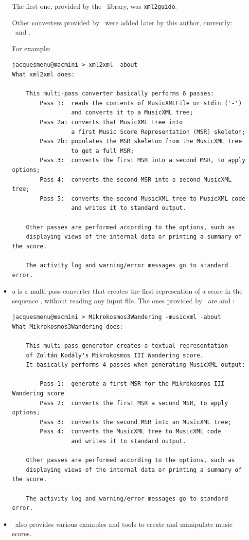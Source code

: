 \begin{itemize}
The first one, provided by the \libmusicxml\ library, was {\tt xml2guido}.

Other converters provided by \mf\ were added later by this author, currently: \xmlToLy\, \xmlToBrl\, \xmlToXml\ and \xmlToGuido.

For example:
\begin{lstlisting}[language=Terminal]
jacquesmenu@macmini > xml2xml -about
What xml2xml does:

    This multi-pass converter basically performs 6 passes:
        Pass 1:  reads the contents of MusicXMLFile or stdin ('-')
                 and converts it to a MusicXML tree;
        Pass 2a: converts that MusicXML tree into
                 a first Music Score Representation (MSR) skeleton;
        Pass 2b: populates the MSR skeleton from the MusicXML tree
                 to get a full MSR;
        Pass 3:  converts the first MSR into a second MSR, to apply options;
        Pass 4:  converts the second MSR into a second MusicXML tree;
        Pass 5:  converts the second MusicXML tree to MusicXML code
                 and writes it to standard output.

    Other passes are performed according to the options, such as
    displaying views of the internal data or printing a summary of the score.

    The activity log and warning/error messages go to standard error.
\end{lstlisting}

\item a  is a multi-pass converter that creates the first represention of a score in the sequence , without reading any input file. The ones provided by \mf\ are  and :
\begin{lstlisting}[language=Terminal]
jacquesmenu@macmini > Mikrokosmos3Wandering -musicxml -about
What Mikrokosmos3Wandering does:

    This multi-pass generator creates a textual representation
    of Zoltán Kodály's Mikrokosmos III Wandering score.
    It basically performs 4 passes when generating MusicXML output:

        Pass 1:  generate a first MSR for the Mikrokosmos III Wandering score
        Pass 2:  converts the first MSR a second MSR, to apply options;
        Pass 3:  converts the second MSR into an MusicXML tree;
        Pass 4:  converts the MusicXML tree to MusicXML code
                 and writes it to standard output.

    Other passes are performed according to the options, such as
    displaying views of the internal data or printing a summary of the score.

    The activity log and warning/error messages go to standard error.
\end{lstlisting}


\item \mf\ also provides various examples and tools to create and manipulate music scores.%
\end{itemize}

